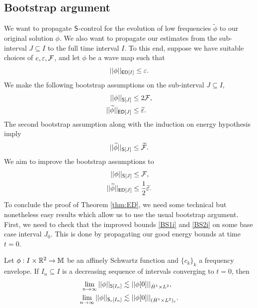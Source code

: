 \subsection{Bootstrap argument}

We want to propagate $\mathsf S$-control for the evolution of low frequencies $\widetilde\phi$ to our original solution $\phi$. We also want to propagate our estimates from the sub-interval $J \subseteq I$ to the full time interval $I$. To this end, suppose we have suitable choices of $e, \varepsilon, \mathcal F$, and let $\phi$ be a wave map such that 
	\begin{equation}
		||\phi||_{\mathsf{ED} [I]} \leq \varepsilon.
		\label{eq:ED1}
	\end{equation}
We make the following bootstrap assumptions on the sub-interval $J \subseteq I$,
	\begin{align}
		||\phi||_{\mathsf S [J]}
			&\leq 2 \mathcal F , \label{eq:BS1}\\
		||\widetilde \phi||_{\mathsf{ED} [J]}
			&\leq \widetilde {\varepsilon} \label{eq:BS2}.
	\end{align}
The second bootstrap assumption along with the induction on energy hypothesis imply
	\begin{align}
		||\widetilde \phi||_{\mathsf S [J]} 
			\leq \widetilde {\mathcal F}.
		\label{eq:induction}
	\end{align}	
We aim to improve the bootstrap assumptions to 
	\begin{align}
		||\phi||_{\mathsf S [J]}
			&\leq \mathcal F, \label{eq:BS1i} \\
		||\widetilde \phi||_{\mathsf{ED} [J]}
			&\leq \frac12\widetilde{\varepsilon} \label{eq:BS2i}. 		
	\end{align}		
To conclude the proof of Theorem \ref{thm:ED}, we need some technical but nonetheless easy results which allow us to use the usual bootstrap argument.  First, we need to check that the improved bounds \eqref{BS1i} and \eqref{BS2i} on some base case interval $J_0$. This is done by propagating our good energy bounds at time $t = 0$.

\begin{lemma}
	Let $\phi : I \times \mathbb R^2 \to \mathbb M$ be an affinely Schwartz function and $\{c_k\}_k$ a frequency envelope. If $I_n \subseteq I$ is a decreasing sequence of intervals converging to $t = 0$, then 
		\begin{align}
			\lim_{n \to \infty} ||\phi||_{\mathsf S[I_n]}
					&\lesssim ||\phi[0]||_{\dot H^1 \times L^2},  \\
				\lim_{n \to \infty} ||\phi||_{\mathsf S_c [I_n]}
					&\lesssim ||\phi[0]||_{(\dot H^1 \times L^2)_c}. 	
			\end{align}		
\end{lemma}

